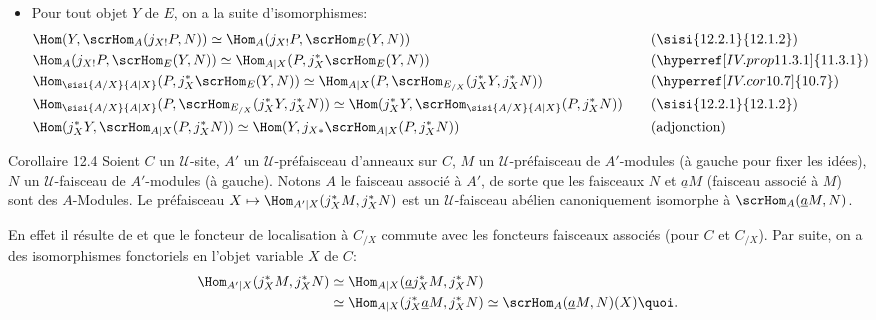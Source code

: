 \documentclass[10pt]{../fichiers-configuration-latex/smfart}
\begin{document}
\begin{itemize}
\item[Démontrons d).] Pour tout objet $Y$ de $E$, on a la suite
d'isomorphismes:
\begin{alignat*}{2}
& \Hom(Y,\scrHom_A(j_{X!}P,N))\simeq \Hom_A(j_{X!}P,\scrHom_E(Y,N))
&\quad& (\sisi{12.2.1}{12.1.2})\\
&\Hom_A(j_{X!}P,\scrHom_E(Y,N))\simeq \Hom_{A|
X}(P,j^{\ast}_X\scrHom_E(Y,N)) && (\hyperref[IV.prop11.3.1]{11.3.1})\\
&\Hom_{\sisi{A/X}{A|X}}(P,j^{\ast}_X\scrHom_E(Y,N))\simeq \Hom_{A|
X}(P,\scrHom_{E_{/X}}(j^{\ast}_XY, j^{\ast}_XN)) && (\hyperref[IV.cor10.7]{10.7})\\
&\Hom_{\sisi{A/X}{A|X}}(P,\scrHom_{E_{/X}}(j^{\ast}_XY, j^{\ast}_XN))\simeq
\Hom(j^{\ast}_XY, \scrHom_{\sisi{A/X}{A|X}}(P,j^{\ast}_XN)) && (\sisi{12.2.1}{12.1.2})\\
&\Hom(j^{\ast}_XY, \scrHom_{A| X}(P,j^{\ast}_XN))\simeq \Hom(Y,
j_{X\ast}\scrHom_{A| X}(P, j^{\ast}_XN)) && \text{(adjonction)}
\end{alignat*}
\end{itemize}

\begin{enonce*}{Corollaire 12.4}
Soient $C$ un $𝒰$-site, $A'$ un $𝒰$-préfaisceau
d'anneaux sur $C$, $M$ un $𝒰$-préfaisceau de $A'$-modules (à
gauche pour fixer les idées), $N$ un $𝒰$-faisceau de
$A'$-modules (à gauche). Notons $A$ le faisceau associé à $A'$, de
sorte que les faisceaux $N$ et $\underline{a}M$ (faisceau associé à $M$)
sont des $A$-Modules. Le préfaisceau $X\mapsto \Hom_{A'|
X}(j^{\ast}_XM, j^{\ast}_XN)$ est un $𝒰$-faisceau abélien
canoniquement isomorphe à $\scrHom_A(\underline{a}M,N)$.
\end{enonce*}

En effet il résulte de  et  que
le foncteur de localisation à $C_{/X}$ commute avec les foncteurs
faisceaux associés (pour $C$ et $C_{/X}$). Par suite, on a des
isomorphismes fonctoriels en l'objet variable $X$ de $C$:
\begin{align*}
\Hom_{A'| X}(j^{\ast}_XM, j^{\ast}_XN) &\simeq \Hom_{A|
X}(\underline{a}j^{\ast}_XM, j^{\ast}_XN)\\
&\simeq \Hom_{A| X}(j^{\ast}_X \underline{a}M, j^{\ast}_XN)\simeq
\scrHom_A (\underline{a}M, N)(X){\quoi}.
\end{align*}
\end{document}
